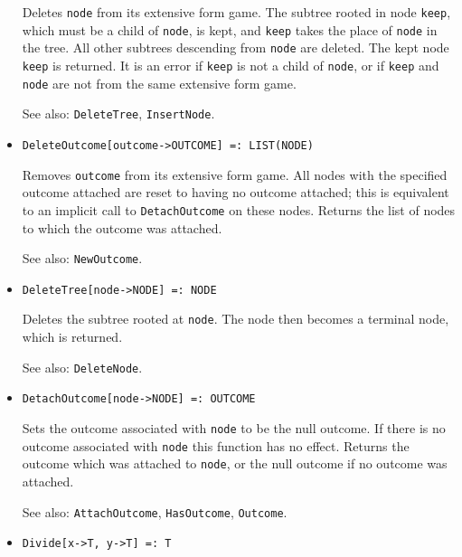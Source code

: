 \begin{itemize}
\bd
Deletes \verb+node+ from its extensive form game.  The
subtree rooted in node \verb+keep+, which must be a child of
\verb+node+, is kept, and \verb+keep+ takes the place of \verb+node+ in
the tree.  All other subtrees descending from \verb+node+ are deleted.
The kept node \verb+keep+ is returned.  It is an error if \verb+keep+
is not a child of \verb+node+, or if \verb+keep+ and \verb+node+ are not
from the same extensive form game.
\item [See also:] \verb+DeleteTree+, \verb+InsertNode+.
\ed

\item
\protect \large \begin{verbatim}
DeleteOutcome[outcome->OUTCOME] =: LIST(NODE)
\end{verbatim}\normalsize

\bd
Removes \verb+outcome+ from its extensive
form game.  All nodes with the specified outcome attached are reset to
having no outcome attached; this is equivalent to an implicit call to
\verb+DetachOutcome+ on these nodes.  Returns the list of nodes to which
the outcome was attached.
\item [See also:] \verb+NewOutcome+.
\ed

\item
\protect \large \begin{verbatim}
DeleteTree[node->NODE] =: NODE
\end{verbatim}\normalsize

\bd
Deletes the subtree rooted at \verb+node+.  The
node then becomes a terminal node, which is returned.
\item [See also:] \verb+DeleteNode+.
\ed

\item
\protect \large \begin{verbatim}
DetachOutcome[node->NODE] =: OUTCOME
\end{verbatim}\normalsize

\bd
Sets the outcome associated with \verb+node+ to be the
null outcome.  If there is no outcome associated with \verb+node+ this
function has no effect.  Returns the outcome which was attached to
\verb+node+, or the null outcome if no outcome was attached.
\item [See also:] \verb+AttachOutcome+, \verb+HasOutcome+, \verb+Outcome+.
\ed

\item 
\protect \large \begin{verbatim}
Divide[x->T, y->T] =: T
\end{verbatim} \normalsize


\end{itemize}
